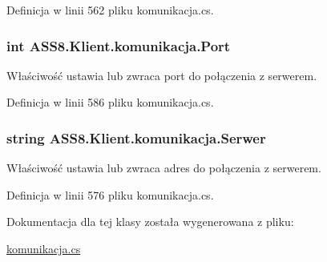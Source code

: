 Definicja w linii 562 pliku komunikacja.cs.\hypertarget{a00013_90c9595c1609fb8364d7e2a8d806a27c}{
\subsubsection[{Port}]{\setlength{\rightskip}{0pt plus 5cm}int ASS8.Klient.komunikacja.Port}}
\label{d7/dd4/a00013_90c9595c1609fb8364d7e2a8d806a27c}


Właściwość ustawia lub zwraca port do połączenia z serwerem. 



Definicja w linii 586 pliku komunikacja.cs.\hypertarget{a00013_d9eb3fc56fa999cc46116e3d7019f070}{
\subsubsection[{Serwer}]{\setlength{\rightskip}{0pt plus 5cm}string ASS8.Klient.komunikacja.Serwer}}
\label{d7/dd4/a00013_d9eb3fc56fa999cc46116e3d7019f070}


Właściwość ustawia lub zwraca adres do połączenia z serwerem. 



Definicja w linii 576 pliku komunikacja.cs.

Dokumentacja dla tej klasy została wygenerowana z pliku:\begin{CompactItemize}
\item 
\hyperlink{a00049}{komunikacja.cs}\end{CompactItemize}
